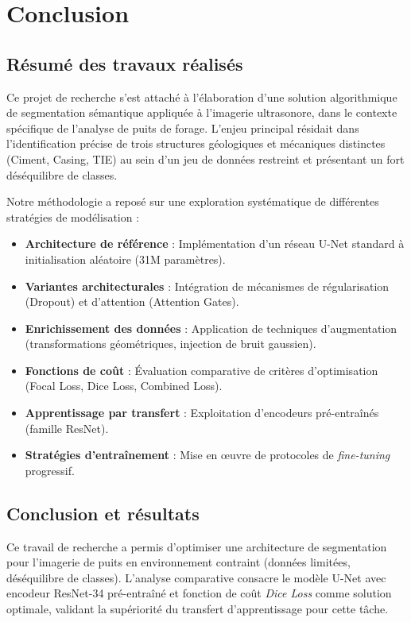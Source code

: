 \section{Conclusion}

\subsection{Résumé des travaux réalisés}

Ce projet de recherche s'est attaché à l'élaboration d'une solution algorithmique de segmentation sémantique appliquée à l'imagerie ultrasonore, dans le contexte spécifique de l'analyse de puits de forage. L'enjeu principal résidait dans l'identification précise de trois structures géologiques et mécaniques distinctes (Ciment, Casing, TIE) au sein d'un jeu de données restreint et présentant un fort déséquilibre de classes.

Notre méthodologie a reposé sur une exploration systématique de différentes stratégies de modélisation :

\begin{itemize}
      \item \textbf{Architecture de référence} : Implémentation d'un réseau U-Net standard à initialisation aléatoire (31M paramètres).
      \item \textbf{Variantes architecturales} : Intégration de mécanismes de régularisation (Dropout) et d'attention (Attention Gates).
      \item \textbf{Enrichissement des données} : Application de techniques d'augmentation (transformations géométriques, injection de bruit gaussien).
      \item \textbf{Fonctions de coût} : Évaluation comparative de critères d'optimisation (Focal Loss, Dice Loss, Combined Loss).
      \item \textbf{Apprentissage par transfert} : Exploitation d'encodeurs pré-entraînés (famille ResNet).
      \item \textbf{Stratégies d'entraînement} : Mise en œuvre de protocoles de \textit{fine-tuning} progressif.
\end{itemize}

\subsection{Conclusion et résultats}

Ce travail de recherche a permis d'optimiser une architecture de segmentation pour l'imagerie de puits en environnement contraint (données limitées, déséquilibre de classes). L'analyse comparative consacre le modèle U-Net avec encodeur ResNet-34 pré-entraîné et fonction de coût \textit{Dice Loss} comme solution optimale, validant la supériorité du transfert d'apprentissage pour cette tâche.

